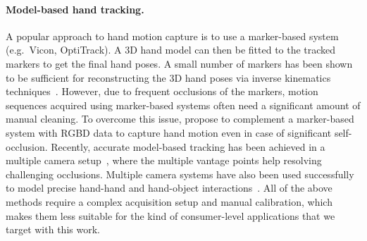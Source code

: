 
\paragraph*{Model-based hand tracking.}

A popular approach to hand motion capture is to use a marker-based system (e.g.\ Vicon, OptiTrack).  A 3D hand model can then be fitted to the tracked markers to get the final hand poses. A small number of markers has been shown to be sufficient for reconstructing the 3D hand poses via inverse kinematics techniques~\cite{Hoyet_i3d12}. However, due to frequent occlusions of the markers, motion sequences acquired using marker-based systems often need a significant amount of manual cleaning. To overcome this issue, \cite{zhao_sca12} propose to complement a marker-based system with RGBD data to capture hand motion even in case of significant self-occlusion.
Recently, accurate model-based tracking has been achieved in a multiple camera setup~\cite{sridhar_iccv13,sridhar_14}, where the multiple vantage points help resolving challenging occlusions. Multiple camera systems have also been used successfully to model precise hand-hand and hand-object interactions~\cite{oiko_iccv11,ballan_eccv13,wang_sig13}. All of the above methods require a complex acquisition setup and manual calibration, which makes them less suitable for the kind of consumer-level applications that we target with this work.

